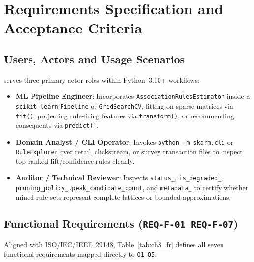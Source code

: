 \chapter{Requirements Specification and Acceptance Criteria}

\section{Users, Actors and Usage Scenarios}
\skarm serves three primary actor roles within Python~3.10+ workflows:
\begin{itemize}
  \item \textbf{ML Pipeline Engineer}: Incorporates \texttt{Association\protect\allowbreak{}Rules\protect\allowbreak{}Estimator} inside a \texttt{scikit-learn} \texttt{Pipeline} or \texttt{GridSearchCV}, fitting on sparse matrices via \texttt{fit()}, projecting rule-firing features via \texttt{transform()}, or recommending consequents via \texttt{predict()}.
  \item \textbf{Domain Analyst / CLI Operator}: Invokes \texttt{python -m skarm.cli} or \texttt{RuleExplorer} over retail, clickstream, or survey transaction files to inspect top-ranked lift/confidence rules cleanly.
  \item \textbf{Auditor / Technical Reviewer}: Inspects \texttt{status\_\protect\allowbreak{}}, \texttt{is\_\protect\allowbreak{}degraded\_\protect\allowbreak{}}, \texttt{pruning\_\protect\allowbreak{}policy\_\protect\allowbreak{}.peak\_\protect\allowbreak{}candidate\_\protect\allowbreak{}count}, and \texttt{metadata\_\protect\allowbreak{}} to certify whether mined rule sets represent complete lattices or bounded approximations.
\end{itemize}

\section{Functional Requirements (\texttt{REQ-F-01}--\texttt{REQ-F-07})}
Aligned with ISO/IEC/IEEE~29148, Table~\ref{tab:ch3_fr} defines all seven functional requirements mapped directly to \texttt{O1}--\texttt{O5}.

